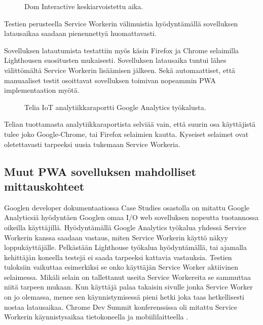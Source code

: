 \documentclass{tktltiki}
\begin{document}
\begin{figure}[!h]
\begin{center}
\caption{Dom Interactive keskiarvoistettu aika.}
\label{Dom Interactive keskiarvoistettu aika}
\end{center}
\end{figure}

Testien perusteella Service Workerin välimuistia hyödyntämällä sovelluksen latausaikaa saadaan pienennettyä huomattavasti. 

Sovelluksen latautumista testattiin myös käsin Firefox ja Chrome selaimilla Lighthousen suositusten mukaisesti. Sovelluksen latausaika tuntui lähes välittömältä Service Workerin lisäämisen jälkeen. Sekä automaattiset, että manuaaliset testit osoittavat sovelluksen toimivan nopeammin PWA implementaation myötä. 

\begin{figure}[!h]
\begin{center}
\caption{Telia IoT analytiikkaraportti Google Analytics työkalusta.}
\label{Google Analytics raportti Telia IoT}
\end{center}
\end{figure}

Telian tuottamasta analytiikkaraportista selviää vain, että suurin osa käyttäjistä tulee joko Google-Chrome, tai Firefox selaimien kautta. Kyseiset selaimet ovat oletettavasti tarpeeksi uusia tukemaan Service Workeria.

\clearpage

\subsection{Muut PWA sovelluksen mahdolliset mittauskohteet}

Googlen developer dokumentaatiossa Case Studies osastolla on mitattu Google Analyticsiä hyödyntäen Googlen omaa I/O web sovelluksen nopeutta tuotannossa oikeilla käyttäjillä. Hyödyntämällä Google Analytics työkalua yhdessä Service Workerin kanssa saadaan vastaus, miten Service Workerin käyttö näkyy loppukäyttäjälle. Pelkästään Lighthouse työkalua hyödyntämällä, tai ajamalla kehittäjän koneella testejä ei saada tarpeeksi kattavia vastauksia. Testien tuloksiin vaikuttaa esimerkiksi se onko käyttäjän Service Worker aktiivinen selaimessa. Mikäli selain on tallettanut useita Service Workereita se sammuttaa niitä tarpeen mukaan. Kun käyttäjä palaa takaisin sivulle jonka Service Worker on jo olemassa, menee sen käynnistymisessä pieni hetki joka taas hetkellisesti nostaa latausaikaa. Chrome Dev Summit konferenssissa oli mitattu Service Workerin käynnistysaikaa tietokoneella ja mobiililaitteella \cite{GoogleDevSummit}. 
\end{document}
